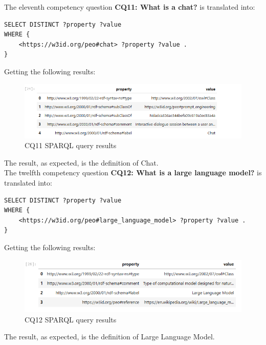 The eleventh competency question \textbf{CQ11: What is a chat?} is translated into:
\begin{lstlisting}
SELECT DISTINCT ?property ?value
WHERE {
    <https://w3id.org/peo#chat> ?property ?value .
}
\end{lstlisting}
Getting the following results:
\begin{figure}[H]
    \centering
    \includegraphics[width=0.9\linewidth]{Figures/fig_57.png}
    \caption{CQ11 SPARQL query results}
    \label{fig:enter-label}
\end{figure}
The result, as expected, is the definition of Chat.\\

The twelfth competency question \textbf{CQ12: What is a large language model?} is translated into:
\begin{lstlisting}
SELECT DISTINCT ?property ?value
WHERE {
    <https://w3id.org/peo#large_language_model> ?property ?value .
}
\end{lstlisting}
Getting the following results:
\begin{figure}[H]
    \centering
    \includegraphics[width=0.9\linewidth]{Figures/fig_58.png}
    \caption{CQ12 SPARQL query results}
    \label{fig:enter-label}
\end{figure}
The result, as expected, is the definition of Large Language Model.\\

